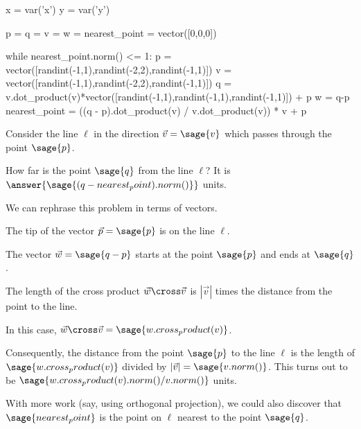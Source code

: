 \documentclass{ximera}
\author{Jim Fowler}
\begin{document}
\makerandom

\begin{sagesilent}
  x = var('x')
  y = var('y')

  p = q = v = w = nearest_point = vector([0,0,0])

  while nearest_point.norm() <= 1:
    p = vector([randint(-1,1),randint(-2,2),randint(-1,1)])
    v = vector([randint(-1,1),randint(-2,2),randint(-1,1)])
    q = v.dot_product(v)*vector([randint(-1,1),randint(-1,1),randint(-1,1)]) + p
    w = q-p
    nearest_point = ((q - p).dot_product(v) / v.dot_product(v)) * v + p
\end{sagesilent}

\begin{exercise}
  Consider the line $\ell$ in the direction $\vec{v} = \sage{v}$ which passes through the point $\sage{p}$.
  
  How far is the point \(\sage{q}\) from the line \(\ell\)?  It is
  \(\answer{\sage{(q - nearest_point).norm()}}\) units.

  \begin{hint}
    We can rephrase this problem in terms of vectors.
  \end{hint}

  \begin{hint}
    The tip of the vector $\vec{p} = \sage{p}$ is on the line $\ell$.
  \end{hint}

  \begin{hint}
    The vector $\vec{w} = \sage{q-p}$ starts at the point $\sage{p}$ and ends at $\sage{q}$.
  \end{hint}

  \begin{hint}
    The length of the cross product $\vec{w} \cross \vec{v}$ is $|\vec{v}|$ times the distance from the point to the line.
  \end{hint}

  \begin{hint}
    In this case, $\vec{w} \cross \vec{v} = \sage{w.cross_product(v)}$.
  \end{hint}

  \begin{hint}
    Consequently, the distance from the point $\sage{p}$ to the line $\ell$ is the length of $\sage{w.cross_product(v)}$ divided by $|\vec{v}| = \sage{v.norm()}$.  This turns out to be $\sage{w.cross_product(v).norm()/v.norm()}$ units.
  \end{hint}

  \begin{hint}
    With more work (say, using orthogonal projection), we could also discover that $\sage{nearest_point}$ is the point on $\ell$ nearest to the point $\sage{q}$.
  \end{hint}
  
\end{exercise}
\end{document}
